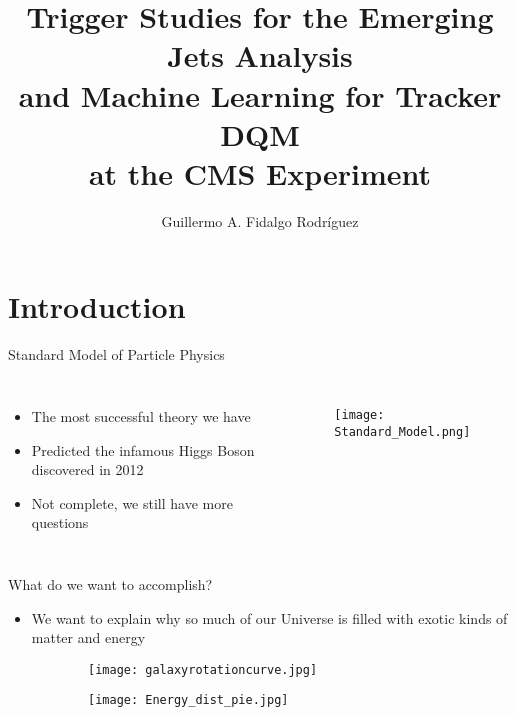 \documentclass[9pt,aspectratio=169]{beamer}
\title[EMJ and ML4TkDQM]{Trigger Studies for the Emerging Jets Analysis \\and Machine Learning for Tracker DQM \\at the CMS Experiment}
\author[GAFR]{Guillermo A. Fidalgo Rodríguez}
\institute[UPRM]{University of Puerto Rico -- Mayagüez}
\begin{document}
\maketitle

\begin{frame}
	\Large
	\tableofcontents
\end{frame}

\section{Introduction}

\begin{frame}{Standard Model of Particle Physics}
	\begin{columns}

		\begin{itemize}
			\item The most successful theory we have
			      \vspace*{1cm}
			\item Predicted the infamous Higgs Boson discovered in 2012
			      \vspace{1cm}
			\item Not complete, we still have more questions
		\end{itemize}
		\begin{figure}
			\texttt{[image: Standard\_Model.png]}
		\end{figure}
	\end{columns}
\end{frame}

\begin{frame}{What do we want to accomplish?}
	\begin{itemize}
		\item We want to explain why so much of our Universe is filled with exotic kinds of matter and energy
	\end{itemize}
	\begin{figure}
		\centering
		\begin{subfigure}{0.45\linewidth}
			\texttt{[image: galaxyrotationcurve.jpg]}
		\end{subfigure}
		\begin{subfigure}{0.45\linewidth}
			\texttt{[image: Energy\_dist\_pie.jpg]}
		\end{subfigure}
	\end{figure}
\end{frame}
\end{document}
